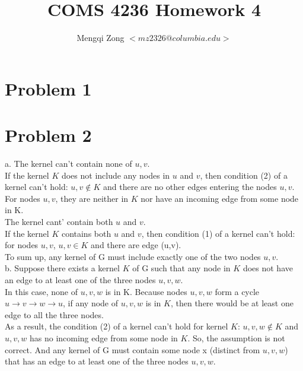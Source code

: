 \documentclass[12pt]{article}
\title{COMS 4236 Homework 4}
\author{Mengqi Zong $<mz2326@columbia.edu>$}
\begin{document}
\maketitle

\setlength{\parindent}{0in}

\section*{Problem 1}


\section*{Problem 2}

a. The kernel can't contain none of $u, v$. \\

If the kernel $K$ does not include any nodes in $u$ and $v$, then condition (2) of a kernel can't hold: $u,v \notin K$ and there are no other edges entering the nodes $u, v$. For nodes $u, v$, they are neither in $K$ nor have an incoming edge from some node in K. \\

The kernel cant' contain both $u$ and $v$. \\

If the kernel $K$ contains both $u$ and $v$, then condition (1) of a kernel can't hold: for nodes $u, v$, $u,v \in K$ and there are edge (u,v). \\

To sum up, any kernel of G must include exactly one of the two nodes $u,v$. \\

b. Suppose there exists a kernel $K$ of G such that any node in $K$ does not have an edge to at least one of the three nodes $u, v, w$. \\

In this case, none of $u, v, w$ is in K. Because nodes $u, v, w$ form a cycle $u \to v \to w \to u$, if any node of $u, v, w$ is in $K$, then there would be at least one edge to all the three nodes. \\

As a result, the condition (2) of a kernel can't hold for kernel $K$: $u, v, w \notin K$ and $u, v, w$ has no incoming edge from some node in $K$. So, the assumption is not correct. And any kernel of G must contain some node x (distinct from $u, v, w$) that has an edge to at least one of the three nodes $u, v, w$. \\
\end{document}
